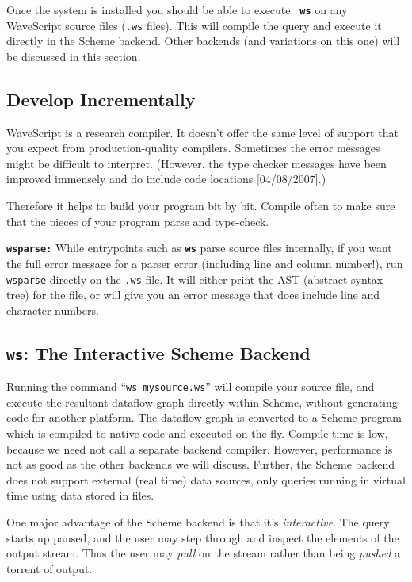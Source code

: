 \documentclass[twocolumn]{report}
\begin{document}
Once the system is installed you should be able to execute {\bf \tt
  ws} on any WaveScript source files ({\tt .ws} files).  This will
compile the query and execute it directly in the Scheme backend.
Other backends (and variations on this one) will be discussed in this
section.  

\subsection*{Develop Incrementally}

WaveScript is a research compiler.  It doesn't offer the same
level of support that you expect from production-quality
compilers.  Sometimes the error messages might be difficult to
interpret.  (However, the type checker messages have been improved
immensely and do include code locations [04/08/2007].)

Therefore it helps to build your program bit by bit.  Compile often to make
sure that the pieces of your program parse and type-check.

{\tt \bf wsparse:} While entrypoints such as {\tt \bf ws} parse source files
internally, if you want the full error message for a parser error
(including line and column number!), run {\tt wsparse} directly on the
{\tt .ws} file.  It will either print the AST (abstract syntax tree) for the
file, or will give you an error message that does include line and
character numbers.

\subsection{{\tt \bf ws}: The Interactive Scheme Backend}

Running the command ``{\tt ws mysource.ws}'' will compile your source
file, and execute the resultant dataflow graph directly within Scheme,
without generating code for another platform.
%
The dataflow graph is converted to a Scheme program which is compiled
to native code and executed on the fly.  Compile time is low, because
we need not call a separate backend compiler.  However, performance is
not as good as the other backends we will discuss.  Further, the
Scheme backend does not support external (real time) data sources,
only queries running in virtual time using data stored in files.

One major advantage of the Scheme backend is that it's {\em
  interactive}.  The query starts up paused, and the user may step
through and inspect the elements of the output stream.  Thus the user
may {\em pull} on the stream rather than being {\em pushed} a torrent
of output.
\end{document}
